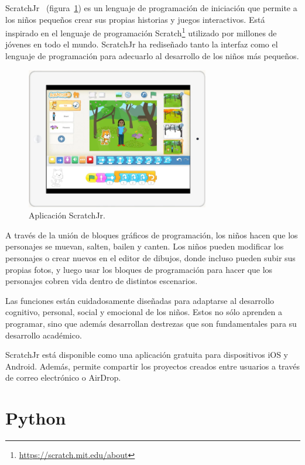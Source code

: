 \documentclass[a4paper, 12pt]{book}
\begin{document}
ScratchJr~\cite{scratchjr} (figura~\ref{fig:scratchjr}) es un lenguaje de programación de iniciación que permite a los niños pequeños crear sus propias historias y juegos interactivos.
Está inspirado en el lenguaje de programación Scratch\footnote{\url{https://scratch.mit.edu/about}} utilizado por millones de jóvenes en todo el mundo.
ScratchJr ha rediseñado tanto la interfaz como el lenguaje de programación para adecuarlo al desarrollo de los niños más pequeños.

\begin{figure}[ht]
  \centering
  \includegraphics[width=8cm, keepaspectratio]{img/scratchjr.png}
  \caption{Aplicación ScratchJr.}\label{fig:scratchjr}
\end{figure}

\vspace{5mm}
A través de la unión de bloques gráficos de programación, los niños hacen que los personajes se muevan, salten, bailen y canten.
Los niños pueden modificar los personajes o crear nuevos en el editor de dibujos, donde incluso pueden subir sus propias fotos, y luego usar los bloques de programación para hacer que los personajes cobren vida dentro de distintos escenarios.

\vspace{5mm}
Las funciones están cuidadosamente diseñadas para adaptarse al desarrollo cognitivo, personal, social y emocional de los niños.
Estos no sólo aprenden a programar, sino que además desarrollan destrezas que son fundamentales para su desarrollo académico.

\vspace{5mm}
ScratchJr está disponible como una aplicación gratuita para dispositivos iOS y Android.
Además, permite compartir los proyectos creados entre usuarios a través de correo electrónico o AirDrop.


\section{Python}
\label{sec:python}
\end{document}
